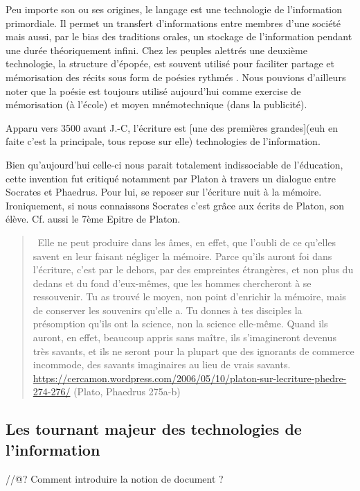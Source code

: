 Peu importe son ou ses origines, le langage est une technologie de l'information primordiale. Il permet un transfert d'informations entre membres d'une société mais aussi, par le bias des traditions orales, un stockage de l'information pendant une durée théoriquement infini. Chez les peuples alettrés une deuxième technologie, la structure d'épopée, est souvent utilisé pour faciliter partage et mémorisation des récits sous form de poésies rythmés \cite{havelock-preface-plato}. Nous pouvions d'ailleurs noter que la poésie est toujours utilisé aujourd'hui comme exercise de mémorisation (à l'école) et moyen mnémotechnique (dans la publicité).

 

Apparu vers 3500 avant J.-C\cite{dreyer00}, l'écriture est [une des premières grandes](euh en
faite c'est la principale, tous repose sur elle) \glspl{technologie} de
l'information. 

Bien qu'aujourd'hui celle-ci nous parait totalement
indissociable de l'éducation, cette invention fut critiqué notamment par Platon
à travers un dialogue entre Socrates et Phaedrus. Pour lui, se reposer sur
l'écriture nuit à la mémoire. Ironiquement, si nous connaissons Socrates c'est
grâce aux écrits de Platon, son élève. Cf. aussi le 7ème Epitre de Platon.


\begin{quote}
\og{}~Elle ne peut produire dans les âmes, en effet, que l’oubli de ce qu’elles 
savent en leur faisant négliger la mémoire. Parce qu’ils auront foi dans 
l’écriture, c’est par le dehors, par des empreintes étrangères, et non plus du 
dedans et du fond d’eux-mêmes, que les hommes chercheront à se ressouvenir. Tu 
as trouvé le moyen, non point d’enrichir la mémoire, mais de conserver les 
souvenirs qu’elle a. Tu donnes à tes disciples la présomption qu’ils ont la 
science, non la science elle-même. Quand ils auront, en effet, beaucoup appris 
sans maître, ils s’imagineront devenus très savants, et ils ne seront pour la 
plupart que des ignorants de commerce incommode, des savants imaginaires au lieu
 de vrais savants.~\fg{}
\url{https://cercamon.wordpress.com/2006/05/10/platon-sur-lecriture-phedre-274-276/}
(Plato, Phaedrus 275a-b)
\end{quote}

\subsection{Les tournant majeur des technologies de l'information}
//@? Comment introduire la notion de document ?

